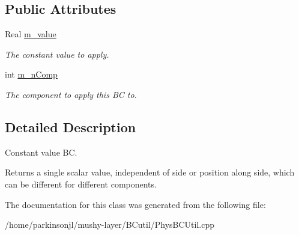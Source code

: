 \subsection*{Public Attributes}
\begin{DoxyCompactItemize}
\item 
\hypertarget{class_const_value_function_ab7eca155d9349f33bc744398a5b34def}{Real \hyperlink{class_const_value_function_ab7eca155d9349f33bc744398a5b34def}{m\-\_\-value}}\label{class_const_value_function_ab7eca155d9349f33bc744398a5b34def}

\begin{DoxyCompactList}\small\item\em The constant value to apply. \end{DoxyCompactList}\item 
\hypertarget{class_const_value_function_a9a8923f47bc33ea19749a2b60b9416e2}{int \hyperlink{class_const_value_function_a9a8923f47bc33ea19749a2b60b9416e2}{m\-\_\-n\-Comp}}\label{class_const_value_function_a9a8923f47bc33ea19749a2b60b9416e2}

\begin{DoxyCompactList}\small\item\em The component to apply this B\-C to. \end{DoxyCompactList}\end{DoxyCompactItemize}


\subsection{Detailed Description}
Constant value B\-C. 

Returns a single scalar value, independent of side or position along side, which can be different for different components. 

The documentation for this class was generated from the following file\-:\begin{DoxyCompactItemize}
\item 
/home/parkinsonjl/mushy-\/layer/\-B\-Cutil/Phys\-B\-C\-Util.\-cpp\end{DoxyCompactItemize}
